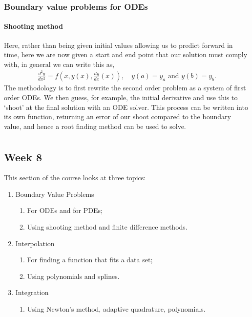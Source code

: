 \documentclass[11pt,a4paper]{report}
\begin{document}
	\subsection{Boundary value problems for ODEs}
	\subsubsection{Shooting method}
	Here, rather than being given initial values allowing us to predict forward in time, here we are now given a start and end point that our solution must comply with, in general we can write this as,
	\begin{align}
	\frac{d^2 y}{dx^2} = f\left(x,y(x), \frac{dy}{dx}(x)\right), \quad y(a) = y_a \text{ and } y(b) = y_b.
	\end{align}
	The methodology is to first rewrite the second order problem as a system of first order ODEs. We then guess, for example, the initial derivative and use this to `shoot' at the final solution with an ODE solver. This process can be written into its own function, returning an error of our shoot compared to the boundary value, and hence a root finding method can be used to solve.
	\chapter{}		
	\section{Week 8}
	This section of the course looks at three topics:
	\begin{enumerate}
		\item Boundary Value Problems
		\begin{enumerate}
			\item For ODEs and for PDEs;
			\item Using shooting method and finite difference methods.
		\end{enumerate}
		\item Interpolation
		\begin{enumerate}
			\item For finding a function that fits a data set;
			\item Using polynomials and splines.
		\end{enumerate}
		\item Integration
		\begin{enumerate}
			\item Using Newton's method, adaptive quadrature, polynomials.
		\end{enumerate}
	\end{enumerate}
\end{document}

